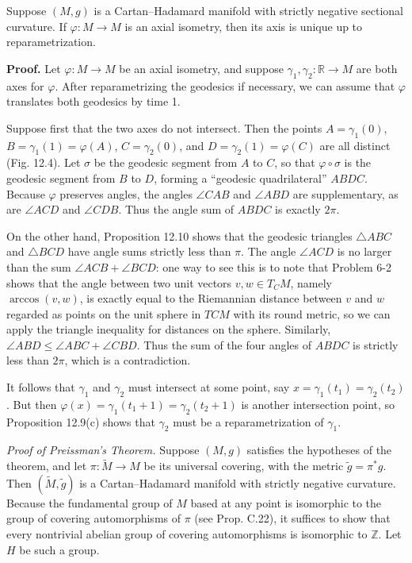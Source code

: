\begin{lemma}
\label{lem:unique-axis-cartan-hadamard}

Suppose $(M, g)$ is a Cartan--Hadamard manifold with strictly negative sectional curvature. If $\varphi : M \to M$ is an axial isometry, then its axis is unique up to reparametrization.

\textbf{Proof.} Let $\varphi : M \to M$ be an axial isometry, and suppose $\gamma_1, \gamma_2 : \mathbb{R} \to M$ are both axes for $\varphi$. After reparametrizing the geodesics if necessary, we can assume that $\varphi$ translates both geodesics by time 1.

Suppose first that the two axes do not intersect. Then the points $A = \gamma_1(0)$, $B = \gamma_1(1) = \varphi(A)$, $C = \gamma_2(0)$, and $D = \gamma_2(1) = \varphi(C)$ are all distinct (Fig. 12.4). Let $\sigma$ be the geodesic segment from $A$ to $C$, so that $\varphi \circ \sigma$ is the geodesic segment from $B$ to $D$, forming a ``geodesic quadrilateral'' $ABDC$. Because $\varphi$ preserves angles, the angles $\angle CAB$ and $\angle ABD$ are supplementary, as are $\angle ACD$ and $\angle CDB$. Thus the angle sum of $ABDC$ is exactly $2\pi$.

On the other hand, Proposition 12.10 shows that the geodesic triangles $\triangle ABC$ and $\triangle BCD$ have angle sums strictly less than $\pi$. The angle $\angle ACD$ is no larger than the sum $\angle ACB + \angle BCD$: one way to see this is to note that Problem 6-2 shows that the angle between two unit vectors $v, w \in T_C M$, namely $\arccos(v, w)$, is exactly equal to the Riemannian distance between $v$ and $w$ regarded as points on the unit sphere in $TC M$ with its round metric, so we can apply the triangle inequality for distances on the sphere. Similarly, $\angle ABD \le \angle ABC + \angle CBD$. Thus the sum of the four angles of $ABDC$ is strictly less than $2\pi$, which is a contradiction.

It follows that $\gamma_1$ and $\gamma_2$ must intersect at some point, say $x = \gamma_1(t_1) = \gamma_2(t_2)$. But then $\varphi(x) = \gamma_1(t_1 + 1) = \gamma_2(t_2 + 1)$ is another intersection point, so Proposition 12.9(c) shows that $\gamma_2$ must be a reparametrization of $\gamma_1$.
\end{lemma}

\textit{Proof of Preissman's Theorem.} Suppose $(M, g)$ satisfies the hypotheses of the theorem, and let $\pi : \tilde{M} \to M$ be its universal covering, with the metric $\tilde{g} = \pi^* g$. Then $(\tilde{M}, \tilde{g})$ is a Cartan--Hadamard manifold with strictly negative curvature. Because the fundamental group of $M$ based at any point is isomorphic to the group of covering automorphisms of $\pi$ (see Prop. C.22), it suffices to show that every nontrivial abelian group of covering automorphisms is isomorphic to $\mathbb{Z}$. Let $H$ be such a group.

